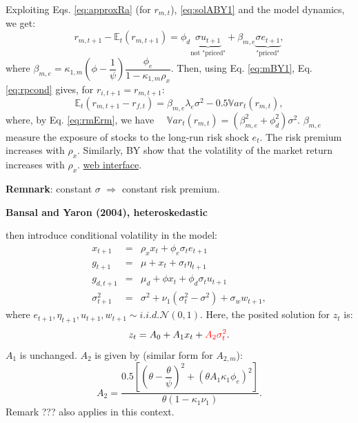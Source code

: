 \documentclass[
  12pt,
]{book}
\theoremstyle{definition}
\theoremstyle{definition}
\theoremstyle{definition}
\theoremstyle{definition}
\theoremstyle{remark}
\begin{document}
Exploiting Eqs. \eqref{eq:approxRa} (for \(r_{m,t}\)), \eqref{eq:solABY1} and the model dynamics, we get:
\begin{equation}
r_{m,t+1} - \mathbb{E}_t(r_{m,t+1}) = \phi_d  \underbrace{\sigma u_{t+1}}_{\mbox{not "priced"}} + \beta_{m,e}  \underbrace{ \sigma e_{t+1}}_{\mbox{"priced"}},\label{eq:rmErm}
\end{equation}
where \(\beta_{m,e} = \kappa_{1,m}\left(\phi - \dfrac{1}{\psi}\right)\dfrac{\phi_e}{1 - \kappa_{1,m} \rho_x}\).
Then, using Eq. \eqref{eq:mBY1}, Eq. \eqref{eq:rpcond} gives, for \(r_{i,t+1}=r_{m,t+1}\):
\begin{equation}
\mathbb{E}_t(r_{m,t+1} - r_{f,t}) = \beta_{m,e}\lambda_{e} \sigma^2 - 0.5 \mathbb{V}ar_t(r_{m,t}),\label{eq:xsBYhomo}
\end{equation}
where, by Eq. \eqref{eq:rmErm}, we have \(\quad\mathbb{V}ar_t(r_{m,t})=(\beta_{m,e}^2+\phi_d^2)\sigma^2\).
\(\beta_{m,e}\) measure the exposure of stocks to the long-run risk shock \(e_t\).
The risk premium increases with \(\rho_x\). Similarly, BY show that the volatility of the market return increases with \(\rho_x\). \href{https://jrenne.shinyapps.io/LRRModels}{web interface}.

\textbf{Remnark}: constant \(\sigma\) \(\Rightarrow\) constant risk premium.

\textbf{Bansal and Yaron (2004), heteroskedastic}

\citet{Bansal_Yaron_2004} then introduce conditional volatility in the model:
\begin{eqnarray}
x_{t+1} &=& \rho_x x_t + \phi_e \sigma_t e_{t+1} \nonumber\\
g_{t+1} &=& \mu + x_t + \sigma_t \eta_{t+1} \nonumber\\
g_{d,t+1} &=& \mu_d + \phi x_t + \phi_d \sigma_t u_{t+1} \nonumber\\
\sigma_{t+1}^2 &=& \sigma^2 + \nu_1(\sigma^2_t -\sigma^2) + \sigma_w w_{t+1}, \label{eq:BYheteroscked}
\end{eqnarray}
where \(e_{t+1},\eta_{t+1},u_{t+1},w_{t+1} \sim i.i.d. \mathcal{N}(0,1)\).
Here, the posited solution for \(z_t\) is:
\[
z_t = A_0 + A_1 x_t + {\color{red}A_2 \sigma^2_t}.
\]
\(A_1\) is unchanged. \(A_2\) is given by (similar form for \(A_{2,m}\)):
\[
A_2 = \frac{0.5 \left[ \left(\theta - \dfrac{\theta}{\psi}\right)^2 + (\theta A_1 \kappa_1 \phi_e)^2 \right]}{\theta(1 - \kappa_1 \nu_1)}.
\]
Remark ??? also applies in this context.
\end{document}
